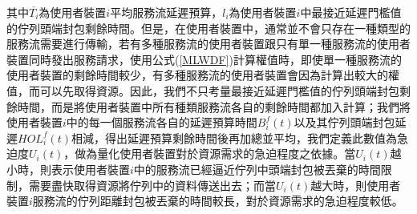 其中$\overline{T_i}$為使用者裝置$i$平均服務流延遲預算，$l_i$為使用者裝置$i$中最接近延遲門檻值的佇列頭端封包剩餘時間。但是，在使用者裝置中，通常並不會只存在一種類型的服務流需要進行傳輸，若有多種服務流的使用者裝置跟只有單一種服務流的使用者裝置同時發出服務請求，使用公式(\ref{MLWDF})計算權值時，即使單一種服務流的使用者裝置的剩餘時間較少，有多種服務流的使用者裝置會因為計算出較大的權值，而可以先取得資源。因此，我們不只考量最接近延遲門檻值的佇列頭端封包剩餘時間，而是將使用者裝置中所有種類服務流各自的剩餘時間都加入計算；我們將使用者裝置$i$中的每一個服務流各自的延遲預算時間$B_i^f(t)$以及其佇列頭端封包延遲$HOL_i^f(t)$相減，得出延遲預算剩餘時間後再加總並平均，我們定義此數值為急迫度$U_i(t)$，做為量化使用者裝置對於資源需求的急迫程度之依據。當$U_i(t)$越小時，則表示使用者裝置$i$中的服務流已經逼近佇列中頭端封包被丟棄的時間限制，需要盡快取得資源將佇列中的資料傳送出去；而當$U_i(t)$越大時，則使用者裝置$i$服務流的佇列距離封包被丟棄的時間較長，對於資源需求的急迫程度較低。

